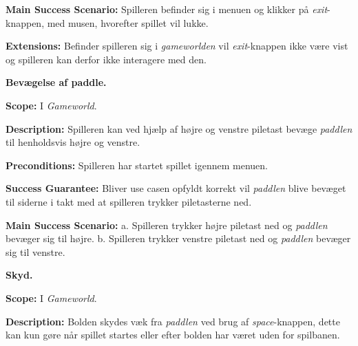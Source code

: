 \textbf{Main Success Scenario:}\newline
Spilleren befinder sig i menuen og klikker på \textit{exit}-knappen, med musen, hvorefter spillet vil lukke.\newline

\textbf{Extensions:}\newline
Befinder spilleren sig i \textit{gameworlden} vil \textit{exit}-knappen ikke være vist og spilleren kan derfor ikke interagere med den. \newline \newline


\textbf{Bevægelse af paddle.}\newline

\textbf{Scope:}\newline
I \textit{Gameworld}.\newline

\textbf{Description:} \newline
Spilleren kan ved hjælp af højre og venstre piletast bevæge \textit{paddlen} til henholdsvis højre og venstre.\newline

\textbf{Preconditions:}\newline
Spilleren har startet spillet igennem menuen.\newline

\textbf{Success Guarantee:}\newline
Bliver use casen opfyldt korrekt vil \textit{paddlen} blive bevæget til siderne i takt med at spilleren trykker piletasterne ned.\newline

\textbf{Main Success Scenario:}\newline
 a. Spilleren trykker højre piletast ned og \textit{paddlen} bevæger sig til højre.\newline
 b. Spilleren trykker venstre piletast ned og \textit{paddlen} bevæger sig til venstre.\newline \newline


\textbf{Skyd.}\newline

\textbf{Scope:}\newline
I \textit{Gameworld}.\newline

\textbf{Description:} \newline
Bolden skydes væk fra \textit{paddlen} ved brug af \textit{space}-knappen, dette kan kun gøre når spillet startes eller efter bolden har været uden for spilbanen. \newline

